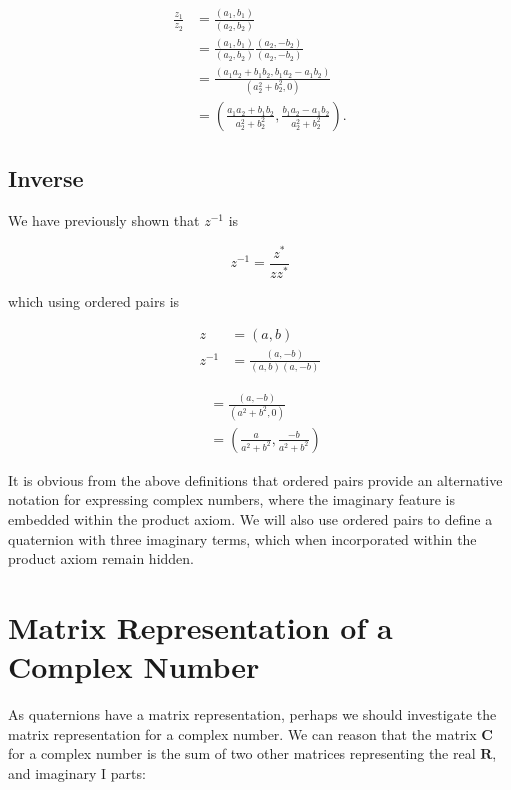 $$
\begin{aligned}
\frac{z_{1}}{z_{2}} & =\frac{\left(a_{1}, b_{1}\right)}{\left(a_{2}, b_{2}\right)} \\
& =\frac{\left(a_{1}, b_{1}\right)}{\left(a_{2}, b_{2}\right)} \frac{\left(a_{2},-b_{2}\right)}{\left(a_{2},-b_{2}\right)} \\
& =\frac{\left(a_{1} a_{2}+b_{1} b_{2}, b_{1} a_{2}-a_{1} b_{2}\right)}{\left(a_{2}^{2}+b_{2}^{2}, 0\right)} \\
& =\left(\frac{a_{1} a_{2}+b_{1} b_{2}}{a_{2}^{2}+b_{2}^{2}}, \frac{b_{1} a_{2}-a_{1} b_{2}}{a_{2}^{2}+b_{2}^{2}}\right) .
\end{aligned}
$$

\subsection{Inverse}
We have previously shown that $z^{-1}$ is

$$
z^{-1}=\frac{z^{*}}{z z^{*}}
$$

which using ordered pairs is

$$
\begin{aligned}
z & =(a, b) \\
z^{-1} & =\frac{(a,-b)}{(a, b)(a,-b)}
\end{aligned}
$$

$$
\begin{aligned}
& =\frac{(a,-b)}{\left(a^{2}+b^{2}, 0\right)} \\
& =\left(\frac{a}{a^{2}+b^{2}}, \frac{-b}{a^{2}+b^{2}}\right)
\end{aligned}
$$

It is obvious from the above definitions that ordered pairs provide an alternative notation for expressing complex numbers, where the imaginary feature is embedded within the product axiom. We will also use ordered pairs to define a quaternion with three imaginary terms, which when incorporated within the product axiom remain hidden.

\section{Matrix Representation of a Complex Number}
As quaternions have a matrix representation, perhaps we should investigate the matrix representation for a complex number. We can reason that the matrix $\mathbf{C}$ for a complex number is the sum of two other matrices representing the real $\mathbf{R}$, and imaginary I parts:

